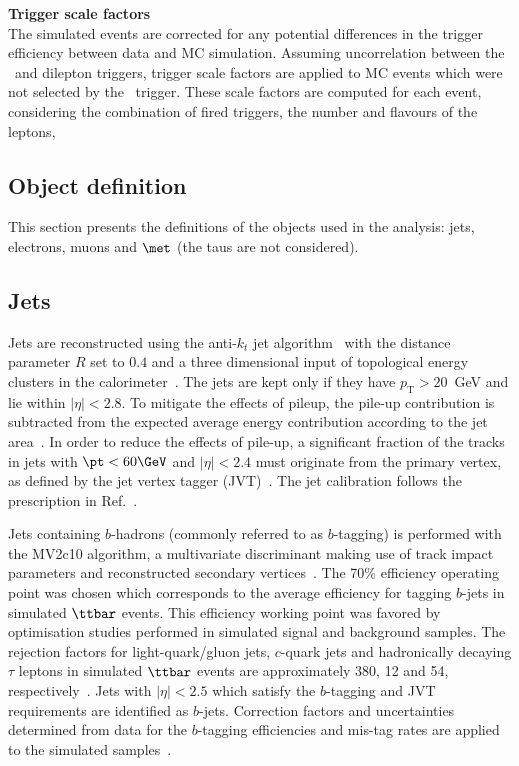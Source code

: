 \par{\bfseries Trigger scale factors\\}
The simulated events are corrected for any potential differences in 
the trigger efficiency between data and MC simulation.
Assuming uncorrelation between the \met\ and dilepton triggers, 
trigger scale factors are applied to MC events which were not selected 
by the \met\ trigger.
These scale factors are computed for each event, considering the combination of fired triggers, the number and flavours of the leptons, 

\subsection{Object definition}
\label{subsec:strategy.sel.obj}

This section presents the definitions of the objects used in the analysis: 
jets, electrons, muons and $\met$ (the taus are not considered).

\subsection*{Jets}
\label{subsec:sec.strategy.sel.objects_jets}


Jets are reconstructed using the anti-$k_{t}$ jet algorithm~\cite{Cacciari:2008gp} 
with the distance parameter $R$ set to $0.4$ and 
a three dimensional input of topological energy clusters in the 
calorimeter~\cite{PERF-2014-07}. 
The jets are kept only if they have $p_\mathrm{T}>20$~GeV and lie 
within $|\eta|<2.8$. 
To mitigate the effects of pileup, the pile-up contribution is subtracted 
from the expected average energy contribution according to the jet area~\cite{Cacciari:2007fd,Aaboud:2017jcu}.
In order to reduce the effects of pile-up, 
a significant fraction of the tracks in jets with $\pt<60 \GeV$ and $|\eta|<2.4$ must originate from the primary vertex, 
as defined by the jet vertex tagger (JVT)~\cite{ATLAS-CONF-2014-018}. 
The jet calibration follows the prescription in Ref.~\cite{Aaboud:2017jcu}.

Jets containing $b$-hadrons (commonly referred to as $b$-tagging) 
is performed with the MV2c10 algorithm, a multivariate discriminant making 
use of track impact parameters 
and reconstructed secondary vertices~\cite{Aad:2015ydr,ATL-PHYS-PUB-2015-022}. 
The 70\% efficiency operating point was chosen which corresponds to the
average efficiency for tagging $b$-jets in simulated $\ttbar$ events. 
This efficiency working point was favored by optimisation studies performed in 
simulated signal and background samples.
The rejection factors for light-quark/gluon jets, $c$-quark jets and hadronically decaying $\tau$ leptons in simulated $\ttbar$ events 
are approximately 380, 12 and 54, respectively~\cite{ATL-PHYS-PUB-2015-022,ATL-PHYS-PUB-2016-012}. 
Jets with $|\eta|<2.5$ which satisfy the $b$-tagging and JVT requirements are identified as $b$-jets. 
Correction factors and uncertainties determined from data for the $b$-tagging efficiencies and mis-tag rates
are applied to the simulated samples~\cite{ATL-PHYS-PUB-2015-022}. 

